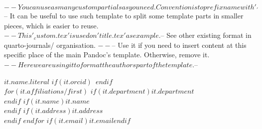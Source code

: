 $-- You can use as many custom partials as you need. Convention is to prefix name with '_'
$-- It can be useful to use such template to split some template parts in smaller pieces, which is easier to reuse. 
$-- This '_custom.tex' is used on 'title.tex' as example.
$-- See other existing format in quarto-journals/ organisation.
$-- %
$-- Use it if you need to insert content at this specific place of the main Pandoc's template. Otherwise, remove it.
$-- Here we are using it to format the authors part of the template.
$-- %

$it.name.literal$%
$if(it.orcid)$~$endif$\\%
$for(it.affiliations/first)$%
    $if(it.department)$$it.department$\\$endif$%
    $if(it.name)$$it.name$\\$endif$%
    $if(it.address)$$it.address$\\$endif$%
$endfor$%
$if(it.email)$\texttt{$it.email$}$endif$